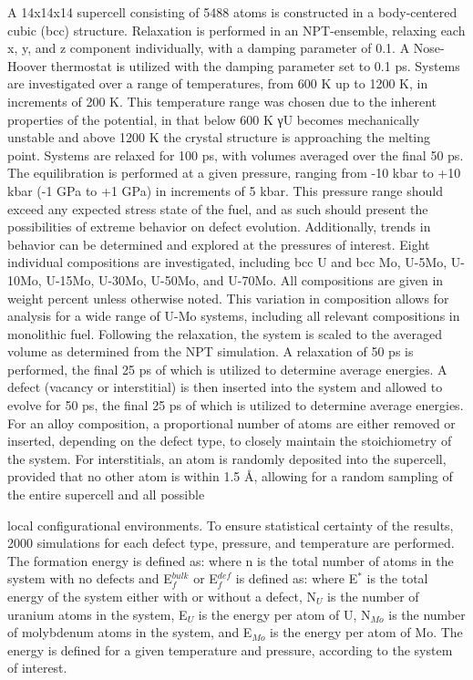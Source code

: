 \documentclass[11pt, oneside]{elsarticle}
\begin{document}
A 14x14x14 supercell consisting of 5488 atoms is constructed in a body-centered cubic (bcc) structure. Relaxation is performed in an NPT-ensemble, relaxing each x, y, and z component individually, with a damping parameter of 0.1. A Nose-Hoover thermostat is utilized with the damping parameter set to 0.1 ps. Systems are investigated over a range of temperatures, from 600 K up to 1200 K, in increments of 200 K. This temperature range was chosen due to the inherent properties of the potential, in that below 600 K γU becomes mechanically unstable and above 1200 K the crystal structure is approaching the melting point. Systems are relaxed for 100 ps, with volumes averaged over the final 50 ps. The equilibration is performed at a given pressure, ranging from -10 kbar to +10 kbar (-1 GPa to +1 GPa) in increments of 5 kbar. This pressure range should exceed any expected stress state of the fuel, and as such should present the possibilities of extreme behavior on defect evolution. Additionally, trends in behavior can be determined and explored at the pressures of interest. Eight individual compositions are investigated, including bcc U and bcc Mo, U-5Mo, U-10Mo, U-15Mo, U-30Mo, U-50Mo, and U-70Mo. All compositions are given in weight percent unless otherwise noted. This variation in composition allows for analysis for a wide range of U-Mo systems, including all relevant compositions in monolithic fuel.  
Following the relaxation, the system is scaled to the averaged volume as determined from the NPT simulation. A relaxation of 50 ps is performed, the final 25 ps of which is utilized to determine average energies. A defect (vacancy or interstitial) is then inserted into the system and allowed to evolve for 50 ps, the final 25 ps of which is utilized to determine average energies. For an alloy composition, a proportional number of atoms are either removed or inserted, depending on the defect type, to closely maintain the stoichiometry of the system. For interstitials, an atom is randomly deposited into the supercell, provided that no other atom is within 1.5 \AA, allowing for a random sampling of the entire supercell and all possible 

local configurational environments. To ensure statistical certainty of the results, 2000 simulations for each defect type, pressure, and temperature are performed. 
The formation energy is defined as:
where n is the total number of atoms in the system with no defects and E$_f^{bulk}$ or E$_f^{def}$ is defined as:
where E$^*$ is the total energy of the system either with or without a defect, N$_U$ is the number of uranium atoms in the system, E$_U$ is the energy per atom of U, N$_{Mo}$ is the number of molybdenum atoms in the system, and E$_{Mo}$ is the energy per atom of Mo. The energy is defined for a given temperature and pressure, according to the system of interest. 
\end{document}
